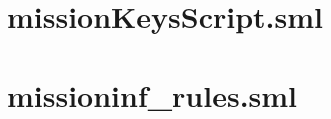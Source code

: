 \documentclass[10pt,twoside]{article}
\begin{document}
\begin{scriptsize}
  \begin{alltt}
    
  \end{alltt}
\end{scriptsize}

\section{missionKeysScript.sml}
\label{sec:missionKeysScript}

\begin{scriptsize}
  \begin{alltt}
    
  \end{alltt}
\end{scriptsize}

\section{missioninf\_rules.sml}
\label{sec:missioninfrules.sml}

\begin{scriptsize}
  \begin{alltt}
    
  \end{alltt}
\end{scriptsize}
\end{document}
